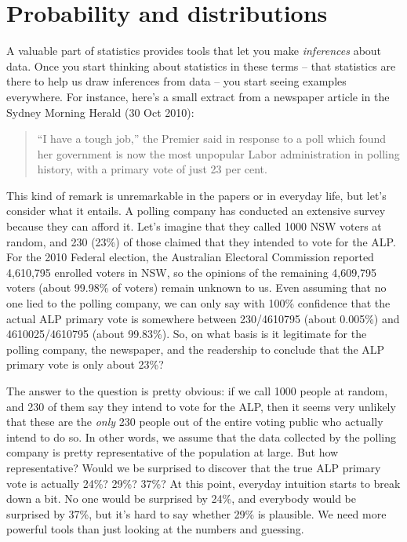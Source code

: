 \documentclass[
]{book}
\theoremstyle{definition}
\theoremstyle{definition}
\theoremstyle{definition}
\theoremstyle{definition}
\theoremstyle{remark}
\begin{document}
\hypertarget{probability}{%
\chapter{Probability and distributions}\label{probability}}

A valuable part of statistics provides tools that let you make \emph{inferences} about data. Once you start thinking about statistics in these terms -- that statistics are there to help us draw inferences from data -- you start seeing examples everywhere. For instance, here's a small extract from a newspaper article in the Sydney Morning Herald (30 Oct 2010):

\begin{quote}
``I have a tough job,'' the Premier said in response to a poll which found her government is now the most unpopular Labor administration in polling history, with a primary vote of just 23 per cent.
\end{quote}

This kind of remark is unremarkable in the papers or in everyday life, but let's consider what it entails. A polling company has conducted an extensive survey because they can afford it. Let's imagine that they called 1000 NSW voters at random, and 230 (23\%) of those claimed that they intended to vote for the ALP. For the 2010 Federal election, the Australian Electoral Commission reported 4,610,795 enrolled voters in NSW, so the opinions of the remaining 4,609,795 voters (about 99.98\% of voters) remain unknown to us. Even assuming that no one lied to the polling company, we can only say with 100\% confidence that the actual ALP primary vote is somewhere between 230/4610795 (about 0.005\%) and 4610025/4610795 (about 99.83\%). So, on what basis is it legitimate for the polling company, the newspaper, and the readership to conclude that the ALP primary vote is only about 23\%?

The answer to the question is pretty obvious: if we call 1000 people at random, and 230 of them say they intend to vote for the ALP, then it seems very unlikely that these are the \emph{only} 230 people out of the entire voting public who actually intend to do so. In other words, we assume that the data collected by the polling company is pretty representative of the population at large. But how representative? Would we be surprised to discover that the true ALP primary vote is actually 24\%? 29\%? 37\%? At this point, everyday intuition starts to break down a bit. No one would be surprised by 24\%, and everybody would be surprised by 37\%, but it's hard to say whether 29\% is plausible. We need more powerful tools than just looking at the numbers and guessing.
\end{document}

